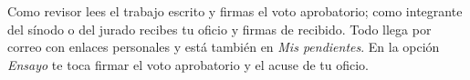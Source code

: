 \documentclass[11pt,a4paper]{article}
\begin{document}
{\small\tableofcontents}
\newpage
\begin{quevasahacer}
Como revisor lees el trabajo escrito y firmas el voto aprobatorio; como integrante del sínodo o del jurado recibes tu oficio y firmas de recibido. Todo llega por correo con enlaces personales y está también en \emph{Mis pendientes}. En la opción \emph{Ensayo} te toca firmar el voto aprobatorio y el acuse de tu oficio.
\end{quevasahacer}



\end{document}
